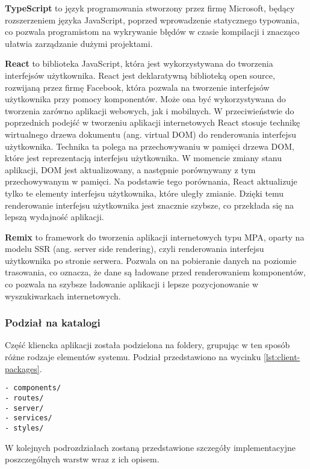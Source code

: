 \textbf{TypeScript} \cite{typescript} to język programowania stworzony przez firmę Microsoft, będący rozszerzeniem języka JavaScript, poprzed wprowadzenie statycznego typowania, co pozwala programistom na wykrywanie błędów w czasie kompilacji i znacząco ułatwia zarządzanie dużymi projektami. 

\textbf{React} \cite{react} to biblioteka JavaScript, która jest wykorzystywana do tworzenia interfejsów użytkownika. React jest deklaratywną biblioteką open source, rozwijaną przez firmę Facebook, która pozwala na tworzenie interfejsów użytkownika przy pomocy komponentów. Może ona być wykorzystywana do tworzenia zarówno aplikacji webowych, jak i mobilnych. W przeciwieństwie do poprzednich podejść w tworzeniu aplikacji internetowych React stosuje technikę wirtualnego drzewa dokumentu (ang. virtual DOM) do renderowania interfejsu użytkownika. Technika ta polega na przechowywaniu w pamięci drzewa DOM, które jest reprezentacją interfejsu użytkownika. W momencie zmiany stanu aplikacji, DOM jest aktualizowany, a następnie porównywany z tym przechowywanym w pamięci. Na podstawie tego porównania, React aktualizuje tylko te elementy interfejsu użytkownika, które uległy zmianie. Dzięki temu renderowanie interfejsu użytkownika jest znacznie szybsze, co przekłada się na lepszą wydajność aplikacji.

\textbf{Remix} \cite{remix} to framework do tworzenia aplikacji internetowych typu MPA, oparty na modelu SSR (ang. server side rendering), czyli renderowania interfejsu użytkownika po stronie serwera. Pozwala on na pobieranie danych na poziomie trasowania, co oznacza, że dane są ładowane przed renderowaniem komponentów, co pozwala na szybsze ładowanie aplikacji i lepsze pozycjonowanie w wyszukiwarkach internetowych.

\subsubsection{Podział na katalogi}

Część kliencka aplikacji została podzielona na foldery, grupując w ten sposób różne rodzaje elementów systemu. Podział przedstawiono na wycinku \ref{lst:client-packages}.

\begin{lstlisting}[caption={Podział na foldery części klienckiej projektu},label={lst:client-packages},captionpos=b]
- components/
- routes/
- server/
- services/
- styles/
\end{lstlisting}

W kolejnych podrozdziałach zostaną przedstawione szczegóły implementacyjne poszczególnych warstw wraz z ich opisem.

